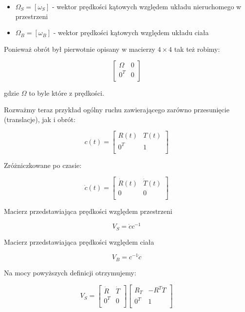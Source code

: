 \documentclass{article}
\begin{document}
\begin{itemize}
    \item $\Omega_{S} = \left[\omega_{S}\right]$ - wektor prędkości kątowych względem układu nieruchomego w przestrzeni
    \item $\Omega_{B} = \left[\omega_{B}\right]$ - wektor prędkości kątowych względem układu ciała
\end{itemize}

Ponieważ obrót był pierwotnie opisany w macierzy $4\times4$ tak też robimy:

$$
    \begin{bmatrix}
        \Omega & 0 \\[0.3em]
        0^{T}  & 0 \\[0.3em]
    \end{bmatrix}
$$

gdzie $\Omega$ to byle które z prędkości.



Rozważmy teraz przykład ogólny ruchu zawierającego zarówno przesunięcie (translacje), jak i obrót:

$$
    c(t)=
    \begin{bmatrix}
        R(t)  & T(t) \\[0.3em]
        0^{T} & 1    \\[0.3em]
    \end{bmatrix}
$$

Zróżniczkowane po czasie:


$$
    \dot c(t)=
    \begin{bmatrix}
        \dot R(t) & \dot T(t) \\[0.3em]
        0         & 0         \\[0.3em]
    \end{bmatrix}
$$



Macierz przedstawiająca prędkości względem przestrzeni

$$
    V_{S} = \dot c c^{-1}
$$



Macierz przedstawiająca prędkości względem ciała

$$
    V_{B} = c^{-1} \dot c
$$

Na mocy powyższych definicji otrzymujemy:

$$
    V_{S}=
    \begin{bmatrix}
        \dot R & \dot T \\[0.3em]
        0^{T}  & 0      \\[0.3em]
    \end{bmatrix}
    \begin{bmatrix}
        R_{T} & -R^{T}T \\[0.3em]
        0^{T} & 1       \\[0.3em]
    \end{bmatrix}
$$
\end{document}
